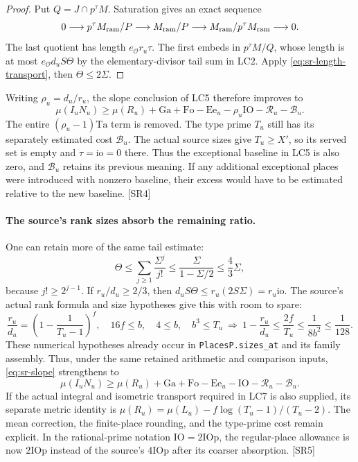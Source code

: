 \begin{proof}
Put $Q=J\cap p^\tau M$. Saturation gives an exact sequence
\[
 0\longrightarrow p^\tau M_{\rm ram}/P
 \longrightarrow M_{\rm ram}/P
 \longrightarrow M_{\rm ram}/p^\tau M_{\rm ram}\longrightarrow0.
\]
The last quotient has length $e_{\mathcal O}r_u\tau$.
The first embeds in $p^\tau M/Q$, whose length is at most
$e_{\mathcal O}d_uS\Theta$ by the elementary-divisor tail sum in LC2.
Apply \eqref{eq:sr-length-transport}, then $\Theta\le2\Sigma$.
\end{proof}

Writing $\rho_u=d_u/r_u$, the slope conclusion of LC5 therefore improves to
\begin{equation}\label{eq:sr-slope}
 \mu(I_uN_u)\ge\mu(R_u)+\mathrm{Ga}+\mathrm{Fo}-\mathrm{Ee}_u
 -\rho_u\mathrm{IO}-\mathcal R_u-\mathcal B_u.
\end{equation}
The entire $(\rho_u-1)\mathrm{Ta}$ term is removed. The type prime
$T_u$ still has its separately estimated cost $\mathcal B_u$.
The actual source sizes give $T_u\ge X'$, so its served set is empty and
$\tau=\mathrm{io}=0$ there. Thus the exceptional baseline in LC5 is also
zero, and $\mathcal B_u$ retains its previous meaning. If any additional
exceptional places were introduced with nonzero baseline, their excess
would have to be estimated relative to the new baseline. \textsf{[SR4]}

\paragraph{The source's rank sizes absorb the remaining ratio.}
One can retain more of the same tail estimate:
\[
 \Theta\le\sum_{j\ge1}\frac{\Sigma^j}{j!}
 \le\frac{\Sigma}{1-\Sigma/2}\le\frac43\Sigma,
\]
because $j!\ge2^{j-1}$. If $r_u/d_u\ge2/3$, then
$d_uS\Theta\le r_u(2S\Sigma)=r_u\mathrm{io}$.
The source's actual rank formula and size hypotheses give this with room
to spare:
\[
 \frac{r_u}{d_u}=\left(1-\frac1{T_u-1}\right)^f,
 \quad16f\le b,\quad4\le b,\quad b^3\le T_u
 \ \Longrightarrow\ 
 1-\frac{r_u}{d_u}\le\frac{2f}{T_u}
 \le\frac1{8b^2}\le\frac1{128}.
\]
These numerical hypotheses already occur in \texttt{PlacesP.sizes\_at}
and its family assembly. Thus, under the same retained arithmetic and
comparison inputs, \eqref{eq:sr-slope} strengthens to
\begin{equation}\label{eq:sr-final}
 \boxed{\mu(I_uN_u)\ge\mu(R_u)+\mathrm{Ga}+\mathrm{Fo}-\mathrm{Ee}_u
 -\mathrm{IO}-\mathcal R_u-\mathcal B_u.}
\end{equation}
If the actual integral and isometric transport required in LC7 is also
supplied, its separate metric identity is
$\mu(R_u)=\mu(L_u)-f\log(T_u-1)/(T_u-2)$.
The mean correction, the finite-place rounding, and the type-prime cost
remain explicit. In the rational-prime notation $\mathrm{IO}=2\mathrm{IOp}$,
the regular-place allowance is now $2\mathrm{IOp}$ instead of the source's
$4\mathrm{IOp}$ after its coarser absorption. \textsf{[SR5]}

